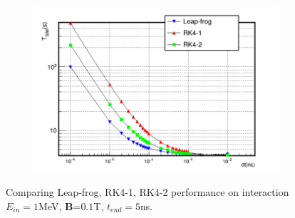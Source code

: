 \documentclass[a4paper,oneside,12pt]{report}
\numberwithin{equation}{chapter}
\begin{document}
{\begin{figure}[H]
    \begin{subfigure}{0.9\textwidth}
        \centering
        \includegraphics[width=\linewidth]{./figures/analiz/lf_rk1_rk2_dt-Tsim_3.png}
    \end{subfigure}
    \caption{Comparing Leap-frog, RK4-1, RK4-2 performance on \eB interaction $E_{in}=1$MeV, \textbf{B}=$0.1$T, $t_{end}=5$ns.}
    \label{fig:lf_rk1_rk2_comparison}
\end{figure} \fi
\begin{figure}[H]
    \centering
    \vspace{10pt}
    

\end{figure}}
\end{document}
